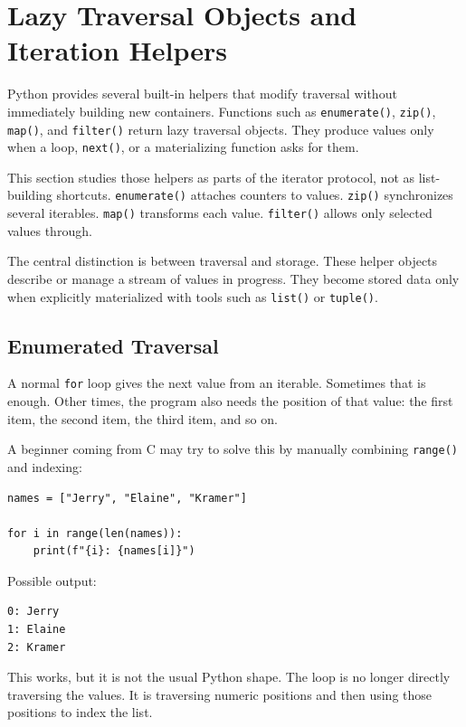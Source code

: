 \documentclass[a4paper,twoside]{report}
\begin{document}
\section{Lazy Traversal Objects and Iteration Helpers}

Python provides several built-in helpers that modify traversal without immediately building new containers. Functions such as \texttt{enumerate()}, \texttt{zip()}, \texttt{map()}, and \texttt{filter()} return lazy traversal objects. They produce values only when a loop, \texttt{next()}, or a materializing function asks for them.

This section studies those helpers as parts of the iterator protocol, not as list-building shortcuts. \texttt{enumerate()} attaches counters to values. \texttt{zip()} synchronizes several iterables. \texttt{map()} transforms each value. \texttt{filter()} allows only selected values through.

The central distinction is between traversal and storage. These helper objects describe or manage a stream of values in progress. They become stored data only when explicitly materialized with tools such as \texttt{list()} or \texttt{tuple()}.

\subsection{Enumerated Traversal}

A normal \texttt{for} loop gives the next value from an iterable. Sometimes that is enough. Other times, the program also needs the position of that value: the first item, the second item, the third item, and so on.

A beginner coming from C may try to solve this by manually combining \texttt{range()} and indexing:

\begin{verbatim}
names = ["Jerry", "Elaine", "Kramer"]

for i in range(len(names)):
    print(f"{i}: {names[i]}")
\end{verbatim}

Possible output:

\begin{verbatim}
0: Jerry
1: Elaine
2: Kramer
\end{verbatim}

This works, but it is not the usual Python shape. The loop is no longer directly traversing the values. It is traversing numeric positions and then using those positions to index the list.
\end{document}
